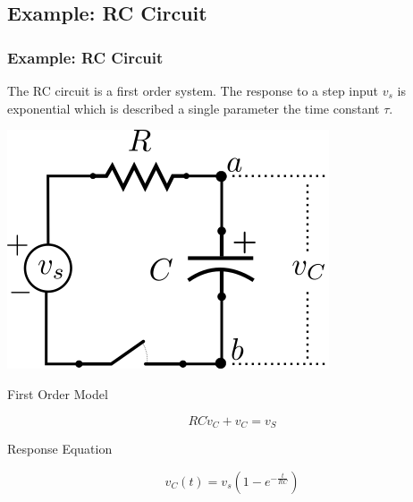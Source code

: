 \documentclass[fleqn]{beamer} %
\newcommand{\sectionIIsubsectionIIItitle}{Example: RC Circuit}
\begin{document}
		\subsection{\sectionIIsubsectionIIItitle}\label{sectionIIsubsectionIII}

			\begin{frame}
				\frametitle{\sectionIIsubsectionIIItitle}

				The RC circuit is a first order system. The response to a step input $v_s$ is exponential which is described a single parameter the time constant $\tau$. 
\vspc

\begin{multicols}{2}
\includegraphics[scale=0.5]{images/rc_circuit.png} 	
	
First Order Model
\begin{fleqn}
\[ RC\dot{v}_C+v_C=v_S \]
\end{fleqn}

Response Equation
\begin{fleqn}
\[v_C\left(t\right)=v_s\left(1-e^{-\frac{t}{RC}}\right) \]
\end{fleqn}

\end{multicols}


			\end{frame}		
\end{document}
